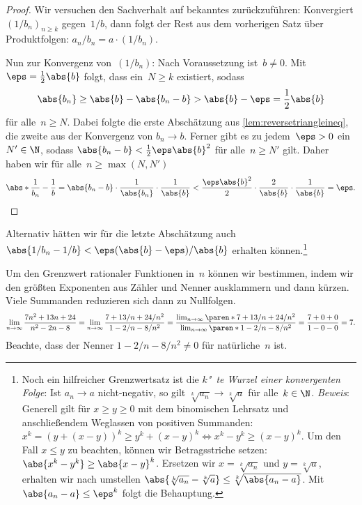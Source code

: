 \documentclass[a4paper]{article}
\begin{document}
\begin{proof}
    Wir versuchen den Sachverhalt auf bekanntes zurückzuführen: Konvergiert $(1/b_n)_{n \geq k}$ gegen~$1/b$, dann folgt der Rest aus dem vorherigen Satz über Produktfolgen: $a_n/b_n = a \cdot (1/b_n)$.

    Nun zur Konvergenz von~$(1/b_n)$: Nach Voraussetzung ist~$b \neq 0$. Mit~$\eps = \frac{1}{2}\abs{b}$ folgt, dass ein~$N \geq k$ existiert, sodass
    \begin{align*}
        \abs{b_n} \geq \abs{b} - \abs{b_n-b} > \abs{b} - \eps = \frac{1}{2}\abs{b}
    \end{align*}
    für alle~$n \geq N$. Dabei folgte die erste Abschätzung aus \cref{lem:reversetriangleineq}, die zweite aus der Konvergenz von $b_n \to b$. Ferner gibt es zu jedem~$\eps > 0$ ein~$N' \in \N$, sodass $\abs{b_n-b} < \frac{1}{2} \eps \abs{b}^2$ für alle~$n \geq N'$ gilt. Daher haben wir für alle~$n \geq \max(N, N')$
    \begin{equation*}
        \abs*{\frac{1}{b_n} - \frac{1}{b}} = \abs{b_n-b} \cdot \frac{1}{\abs{b_n}} \cdot \frac{1}{\abs{b}} < \frac{\eps \abs{b}^2}{2} \cdot \frac{2}{\abs{b}} \cdot \frac{1}{\abs{b}} = \eps. \qedhere
    \end{equation*}
\end{proof}

Alternativ hätten wir für die letzte Abschätzung auch $\abs{1/b_n - 1/b} < \eps (\abs{b} - \eps) / \abs{b}$ erhalten können.\footnote{Noch ein hilfreicher Grenzwertsatz ist die \emph{$k$"~te Wurzel einer konvergenten Folge}: Ist $a_n \to a$ nicht-negativ, so gilt $\sqrt[k]{a_n} \to \sqrt[k]{a}$ für alle~$k \in \N$. \emph{Beweis}: Generell gilt für $x \geq y \geq 0$ mit dem binomischen Lehrsatz und anschließendem Weglassen von positiven Summanden: $x^k = (y+(x-y))^k \geq y^k + (x-y)^k \iff x^k-y^k \geq (x-y)^k$. Um den Fall $x \leq y$ zu beachten, können wir Betragsstriche setzen: $\abs{x^k-y^k} \geq \abs{x-y}^k$. Ersetzen wir $x = \sqrt[k]{a_n}$ und $y = \sqrt[k]{a}$, erhalten wir nach umstellen $\abs{\sqrt[k]{a_n}-\sqrt[k]{a}} \leq \sqrt[k]{\abs{a_n-a}}$. Mit $\abs{a_n-a} \leq \eps^k$ folgt die Behauptung.}

\begin{example}
    Um den Grenzwert rationaler Funktionen in~$n$ können wir bestimmen, indem wir den größten Exponenten aus Zähler und Nenner ausklammern und dann kürzen. Viele Summanden reduzieren sich dann zu Nullfolgen.
    \begin{equation*}
        \lim_{n\to\infty} \frac{7n^2 + 13n + 24}{n^2 - 2n - 8} = \lim_{n\to\infty} \frac{7 + 13/n + 24/n^2}{1 - 2/n - 8/n^2} = \frac{\lim_{n\to\infty} \paren*{7 + 13/n + 24/n^2}}{\lim_{n\to\infty} \paren*{1 - 2/n - 8/n^2}} = \frac{7 + 0 + 0}{1 - 0 - 0} = 7.
    \end{equation*}
    Beachte, dass der Nenner $1 - 2/n - 8/n^2 \neq 0$ für natürliche~$n$ ist.
\end{example}
\end{document}
